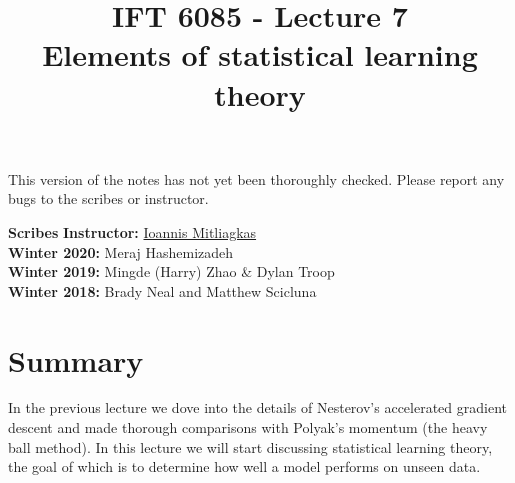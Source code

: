 \documentclass{article}
\title{IFT 6085 - Lecture 7 \\ 
Elements of statistical learning theory}
\date{}
\begin{document}
 

\maketitle

\vspace{-0.5in}
\begin{center}
This version of the notes has not yet been thoroughly checked.
Please report any bugs to the scribes or instructor.
\end{center}
\vspace{0.2in}

\textbf{Scribes}\hfill
\textbf{Instructor:} {\href{https://mitliagkas.github.io/}{Ioannis Mitliagkas}}\\
\textbf{Winter 2020:} Meraj Hashemizadeh\\
\textbf{Winter 2019:} Mingde (Harry) Zhao \& Dylan Troop\\
\textbf{Winter 2018:} Brady Neal and Matthew Scicluna
\hfill



\newcommand{\infgc}{\inf_{g \in \mathcal{C}}}
\newcommand{\supgc}{\sup_{g \in \mathcal{C}}}

\newcommand{\Prob}{\mathbb{P}}
\newcommand{\E}{\mathbb{E}}
\newcommand{\R}{\mathbb{R}}

\newcommand{\PP}{\mathbb{P}} %
\newcommand{\HH}{\mathcal{H}}   %
\newcommand{\X}{\mathcal{X}}    %
\newcommand{\Y}{\mathcal{Y}}    %
\newcommand{\D}{\mathcal{D}}    %
\newcommand{\yhat}{\hat{y}}     %
\newcommand{\Rhat}{\hat{R}_S}     %
\newcommand{\egen}{\epsilon_{\text{gen}}(h_S)}  %

\newcommand{\iid}{\textit{i.i.d.}}

\section{Summary}

In the previous lecture we dove into the details of Nesterov's accelerated gradient descent and made thorough comparisons with Polyak's momentum (the heavy ball method). In this lecture we will start discussing statistical learning theory, the goal of which is to determine how well a model performs on unseen data.
 
\end{document}
